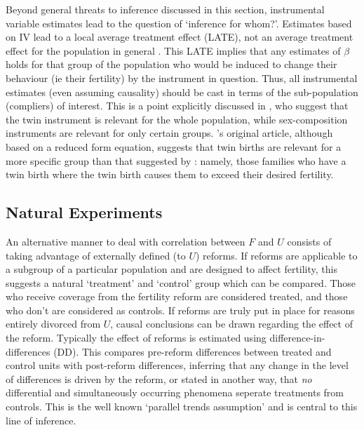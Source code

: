 \documentclass{article}
\begin{document}
\begin{spacing}{1.4}
Beyond general threats to inference discussed in this section, instrumental 
variable estimates lead to the question of `inference for whom?'.  Estimates 
based on IV lead to a local average treatment effect (LATE), not an average 
treatment effect for the population in general \citep{ImbensAngrist1994,
Ebenstein2009}.  This LATE implies that any estimates of $\beta$ holds for that 
group of the population who would be induced to change their behaviour (ie their 
fertility) by the instrument in question. Thus, all instrumental estimates (even 
assuming causality) should be cast in terms of the sub-population (compliers) of 
interest.  This is a point explicitly discussed in \citet{Angristetal2010}, who 
suggest that the twin instrument is relevant for the whole population, while 
sex-composition instruments are relevant for only certain groups. 
\citet{RosenzweigWolpin1980}'s original article, although based on a reduced 
form equation, suggests that twin births are relevant for a more specific group 
than that suggested by \citet{Angristetal2010}: namely, those families who have 
a twin birth where the twin birth causes them to exceed their desired fertility. 
%


\subsection{Natural Experiments}
\label{Fsscn:kidNExp}
An alternative manner to deal with correlation between $F$ and $U$ consists of
taking advantage of externally defined (to $U$) reforms.  If reforms are 
applicable to a subgroup of a particular population and are designed to affect
fertility, this suggests a natural `treatment' and `control' group which can
be compared. Those who receive coverage from the fertility reform are considered 
treated, and those who don't are considered as controls.  If reforms are truly 
put in place for reasons entirely divorced from $U$, causal conclusions can be 
drawn regarding the effect of the reform.  Typically the effect of reforms is 
estimated using difference-in-differences (DD).  This compares pre-reform 
differences between treated and control units with post-reform differences, 
inferring that any change in the level of differences is driven by the reform, 
or stated in another way, that \emph{no} differential and simultaneously 
occurring phenomena seperate treatments from controls.  This is the well known 
`parallel trends assumption' and is central to this line of inference.


\end{spacing}
\end{document}
